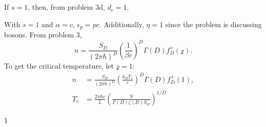 \documentclass[a4paper,12pt,twoside]{article}
\newcommand{\mcols}{0}
\begin{document}
\begin{multicols*}{2}
\subsection{}
If $s = 1$, then, from problem 3d, $d_c = 1$.

With $s = 1$ and $\alpha = c$, $\epsilon_p = pc$.
Additionally, $\eta = 1$ since the problem is discussing bosons.
From problem 3,
\begin{equation}
	n = \frac{S_D}{(2\pi\hbar)^D}\left(\frac{1}{\beta c}\right)^D \Gamma(D) f_D^+(\mathcal{z}).
\end{equation}
To get the critical temperature, let $\mathcal{z} = 1$:
\begin{align}
	n
	&= \frac{S_D}{(2\pi\hbar)^D}\left(\frac{k_B T_c}{c}\right)^D \Gamma(D) f_D^+(1),\\
	T_c &= \frac{2\pi\hbar c}{L} \left(\frac{N}{\Gamma(D)\zeta(D)S_D}\right)^{1/D}
\end{align}

\printBib


\if\mcols1
\end{multicols*}
\fi
\end{document}
